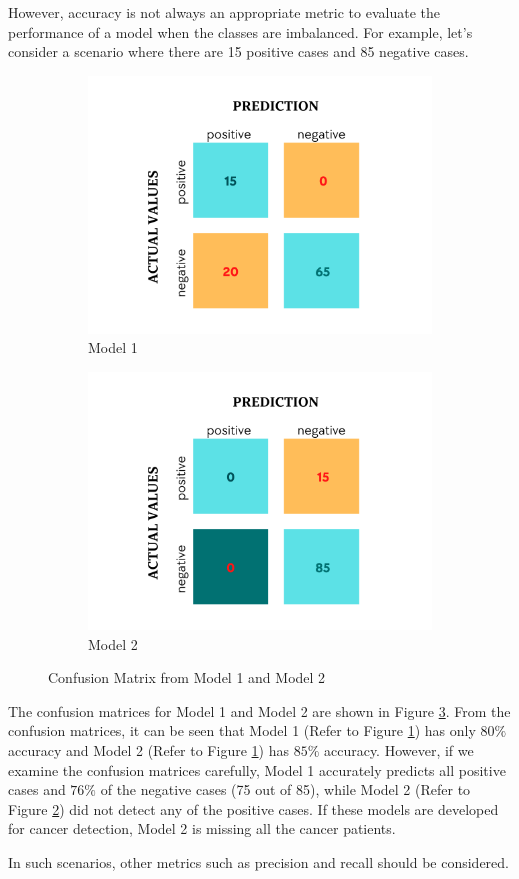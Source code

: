 However, accuracy is not always an appropriate metric to evaluate the performance of a model when the classes are imbalanced. For example, let's consider a scenario where there are 15 positive cases and 85 negative cases.
\begin{figure}[!h]
  \centering
    \begin{subfigure}[b]{0.7\textwidth}
         \centering
         \includegraphics[width=5 cm]{cm_3e.png}
         \caption{Model 1}
         \label{fig:mdoel1_cm}
     \end{subfigure}
     \begin{subfigure}[b]{0.7\textwidth}
         \centering
         \includegraphics[width=5 cm]{cm_4e.png}
         \caption{Model 2}
         \label{fig:mdoel2_cm}
     \end{subfigure}
  \caption{Confusion Matrix from Model 1 and Model 2}
  \label{fig:cls_cm_Imb}
\end{figure} The confusion matrices for Model 1 and Model 2 are shown in Figure \ref{fig:cls_cm_Imb}. From the confusion matrices, it can be seen that Model 1 (Refer to Figure \ref{fig:mdoel1_cm}) has only $80\%$ accuracy and Model 2 (Refer to Figure \ref{fig:mdoel1_cm}) has $85\%$ accuracy. However, if we examine the confusion matrices carefully, Model 1 accurately predicts all positive cases and $76\%$ of the negative cases (75 out of 85), while Model 2 (Refer to Figure \ref{fig:mdoel2_cm}) did not detect any of the positive cases. If these models are developed for cancer detection, Model 2 is missing all the cancer patients.

In such scenarios, other metrics such as precision and recall should be considered.

